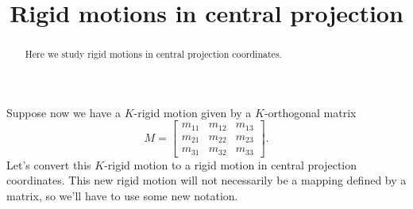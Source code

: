 \documentclass[newpage,hints,handout,12pt,nooutcomes,noauthor]{ximera}
\title{Rigid motions in central projection}
\begin{document}
\begin{abstract}
  Here we study rigid motions in central projection coordinates.
\end{abstract}
\maketitle


Suppose now we have a $K$-rigid motion given by a $K$-orthogonal matrix%
\[
M=\begin{bmatrix}
m_{11} & m_{12} & m_{13}\\
m_{21} & m_{22} & m_{23}\\
m_{31} & m_{32} & m_{33}
\end{bmatrix}.
\]
Let's convert this $K$-rigid motion to a rigid motion in central
projection coordinates. This new rigid motion will not necessarily be
a mapping defined by a matrix, so we'll have to use some new notation.

\begin{center}
\end{center}
\end{document}
